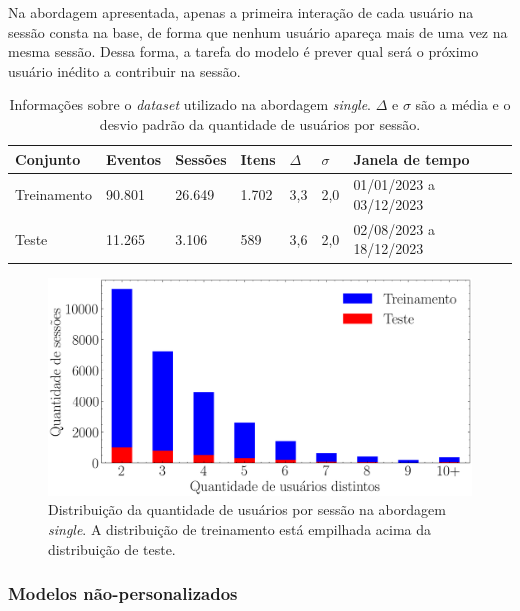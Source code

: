 Na abordagem apresentada, apenas a primeira interação de cada usuário na
sessão consta na base, de forma que nenhum usuário apareça mais de uma vez na
mesma sessão. Dessa forma, a tarefa do modelo é prever qual será o próximo usuário
inédito a contribuir na sessão.


  \begin{table}
    \centering
    \begin{tabular}{|l|l|l|l|l|l|l|}
      \hline
      Conjunto & Eventos & Sessões & Itens & $\Delta$ & $\sigma$ & Janela de tempo \\ \hline 
         Treinamento & 90.801 & 26.649 & 1.702 & 3,3 & 2,0 & 01/01/2023 a 03/12/2023 \\ \hline
        Teste & 11.265 & 3.106 & 589 & 3,6 & 2,0 & 02/08/2023 a 18/12/2023 \\ \hline
    \end{tabular}
    \caption{Informações sobre o \textit{dataset} utilizado na abordagem
    \textit{single}. $\Delta$ e $\sigma$ são a média e o desvio padrão da quantidade de
    usuários por sessão.}
    \label{tab:split_data}
  \end{table}

  \begin{figure}[ht]
    \centering
    \includegraphics[width=1\textwidth]{chapters/chap04/images/histograma.png}
    \caption{Distribuição da quantidade de usuários por sessão na abordagem
    \textit{single}. A distribuição de treinamento está empilhada acima da
    distribuição de teste.}
    \label{fig:next-item-single}
  \end{figure}
 

  \subsubsection{Modelos não-personalizados}

